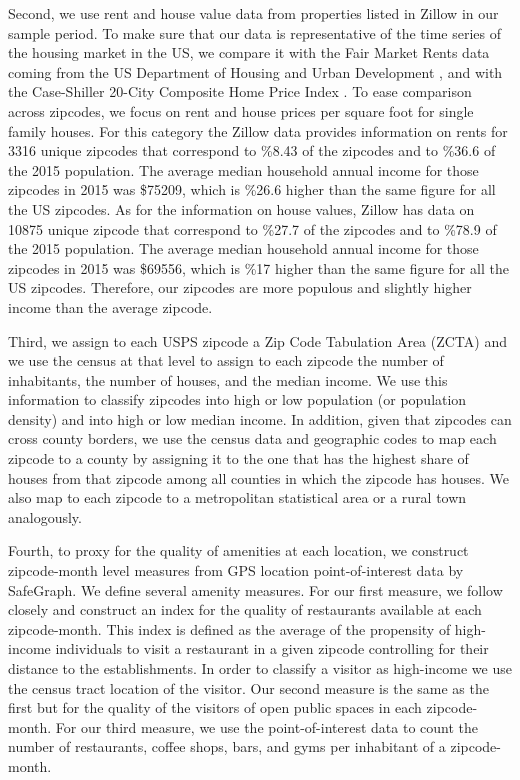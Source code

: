 \documentclass{article}
\begin{document}
Second, we use rent and house value data from properties listed in Zillow \parencite{zillow} in our sample period. To make sure that our data is representative of the time series of the housing market in the US, we compare it with the Fair Market Rents data coming from the US Department of Housing and Urban Development \parencite{hud}, and with the Case-Shiller 20-City Composite Home Price Index \parencite{case}. To ease comparison across zipcodes, we focus on rent and house prices per square foot for single family houses. For this category the Zillow data provides information on rents for 3316 unique zipcodes that correspond to \%8.43 of the zipcodes and to \%36.6 of the 2015 population. The average median household annual income for those zipcodes in 2015 was \$75209, which is \%26.6 higher than the same figure for all the US zipcodes. As for the information on house values, Zillow has data on 10875 unique zipcode that correspond to \%27.7 of the zipcodes and to \%78.9 of the 2015 population. The average median household annual income for those zipcodes in 2015 was \$69556, which is \%17 higher than the same figure for all the US zipcodes. Therefore, our zipcodes are more populous and slightly higher income than the average zipcode. 

Third, we assign to each USPS zipcode a Zip Code Tabulation Area (ZCTA) and we use the census at that level to assign to each zipcode the number of inhabitants, the number of houses, and the median income. We use this information to classify zipcodes into high or low population (or population density) and into high or low median income. In addition, given that zipcodes can cross county borders, we use the census data and geographic codes to map each zipcode to a county by assigning it to the one that has the highest share of houses from that zipcode among all counties in which the zipcode has houses. We also map to each zipcode to a metropolitan statistical area or a rural town analogously.

Fourth, to proxy for the quality of amenities at each location, we construct zipcode-month level measures from GPS location point-of-interest data by SafeGraph\parencite{safegraph}. We define several amenity measures. For our first measure, we follow closely \textcite{couture2019income} and construct an index for the quality of restaurants available at each zipcode-month. This index is defined as the average of the propensity of high-income individuals to visit a restaurant in a given zipcode controlling for their distance to the establishments. In order to classify a visitor as high-income we use the census tract location of the visitor. Our second measure is the same as the first but for the quality of the visitors of open public spaces in each zipcode-month. For our third measure, we use the point-of-interest data to count the number of restaurants, coffee shops, bars, and gyms per inhabitant of a zipcode-month. 
\end{document}
